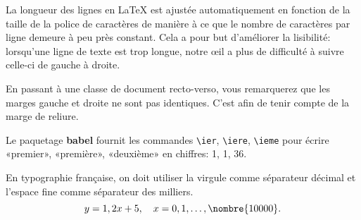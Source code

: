 \documentclass[12pt]{memoir}
\begin{document}
La longueur des lignes en {\LaTeX} est ajustée automatiquement en
fonction de la taille de la police de caractères de manière à ce que le
nombre de caractères par ligne demeure à peu près constant. Cela a
pour but d'améliorer la lisibilité: lorsqu'une ligne de texte est trop
longue, notre œil a plus de difficulté à suivre celle-ci de gauche à
droite.

En passant à une classe de document recto-verso, vous remarquerez que
les marges gauche et droite ne sont pas identiques. C'est afin de
tenir compte de la marge de reliure.

Le paquetage \textbf{babel} fournit les commandes \verb=\ier=,
\verb=\iere=, \verb=\ieme= pour écrire «premier», «première»,
«deuxième» en chiffres: 1{\ier}, 1{\iere}, 36{\ieme}.

En typographie française, on doit utiliser la virgule comme séparateur
décimal et l'espace fine comme séparateur des milliers.
\begin{displaymath}
  y = 1,2x + 5, \quad x = 0, 1, \dots, \nombre{10 000}.
\end{displaymath}
\end{document}

